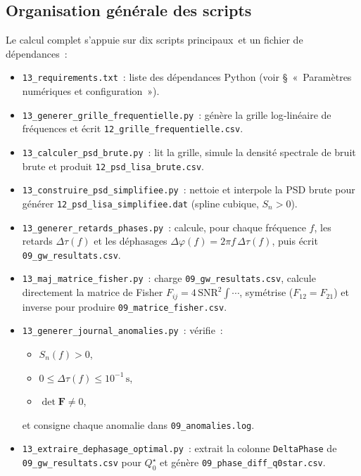 \subsection{Organisation générale des scripts}
Le calcul complet s’appuie sur dix scripts principaux et un fichier de dépendances :

\begin{itemize}
  \item \texttt{13\_requirements.txt} : liste des dépendances Python (voir § « Paramètres numériques et configuration »).

  \item \texttt{13\_generer\_grille\_frequentielle.py} : génère la grille log‑linéaire de fréquences et écrit \texttt{12\_grille\_frequentielle.csv}.

  \item \texttt{13\_calculer\_psd\_brute.py} : lit la grille, simule la densité spectrale de bruit brute et produit \texttt{12\_psd\_lisa\_brute.csv}.

  \item \texttt{13\_construire\_psd\_simplifiee.py} : nettoie et interpole la PSD brute pour générer \texttt{12\_psd\_lisa\_simplifiee.dat} (spline cubique, $S_n>0$).

  \item \texttt{13\_generer\_retards\_phases.py} : calcule, pour chaque fréquence $f$, les retards $\Delta\tau(f)$ et les déphasages $\Delta\varphi(f)=2\pi f\,\Delta\tau(f)$, puis écrit \texttt{09\_gw\_resultats.csv}.

  \item \texttt{13\_maj\_matrice\_fisher.py} : charge \texttt{09\_gw\_resultats.csv}, calcule directement la matrice de Fisher $F_{ij}=4\,\mathrm{SNR}^2\int\cdots$, symétrise ($F_{12}=F_{21}$) et inverse pour produire \texttt{09\_matrice\_fisher.csv}.

  \item \texttt{13\_generer\_journal\_anomalies.py} : vérifie :
    \begin{itemize}
      \item $S_n(f)>0$,  
      \item $0 \le \Delta\tau(f)\le10^{-1}\,\mathrm{s}$,  
      \item $\det\mathbf{F}\neq0$,  
    \end{itemize}
    et consigne chaque anomalie dans \texttt{09\_anomalies.log}.

  \item \texttt{13\_extraire\_dephasage\_optimal.py} : extrait la colonne \texttt{DeltaPhase} de \texttt{09\_gw\_resultats.csv} pour $Q_{0}^{\star}$ et génère \texttt{09\_phase\_diff\_q0star.csv}.


\end{itemize}
